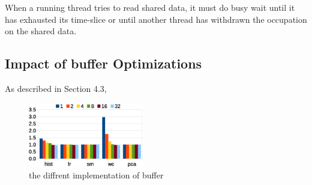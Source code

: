 
When a running thread tries to read shared data,
it must do busy wait until it has exhausted its time-slice
or until another thread has withdrawn the occupation on the
shared data. 














\subsection{ Impact of buffer Optimizations}
As described in Section 4.3, 
\begin{figure}[!h!t]  
	\centering
	\includegraphics[width=0.45\textwidth]{eps/smr_diff_buffer.eps}
	\caption{the diffrent implementation of buffer}
	\label{fig:env:init}
\end{figure}


